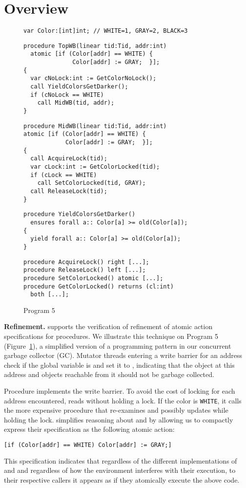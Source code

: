 \section{Overview}
\label{sec:overview}

\begin{figure}
\begin{verbatim}
var Color:[int]int; // WHITE=1, GRAY=2, BLACK=3
\end{verbatim}
\begin{verbatim}
procedure TopWB(linear tid:Tid, addr:int)
  atomic [if (Color[addr] == WHITE) { 
              Color[addr] := GRAY;  }];
{
  var cNoLock:int := GetColorNoLock();
  call YieldColorsGetDarker(); 
  if (cNoLock == WHITE) 
    call MidWB(tid, addr);
}
\end{verbatim}
\begin{verbatim}
procedure MidWB(linear tid:Tid, addr:int)
atomic [if (Color[addr] == WHITE) {
            Color[addr] := GRAY;  }];
{
  call AcquireLock(tid);
  var cLock:int := GetColorLocked(tid);
  if (cLock == WHITE) 
    call SetColorLocked(tid, GRAY);
  call ReleaseLock(tid);
}
\end{verbatim}
\begin{verbatim}
procedure YieldColorsGetDarker()
  ensures forall a:: Color[a] >= old(Color[a]);
{
  yield forall a:: Color[a] >= old(Color[a]);
}
\end{verbatim}
\begin{verbatim}
procedure AcquireLock() right [...];
procedure ReleaseLock() left [...];
procedure SetColorLocked() atomic [...];
procedure GetColorLocked() returns (cl:int)
  both [...];
\end{verbatim}
\caption{Program 5}
\label{fig:reft}
\end{figure}

{\bf Refinement.} 
\civl supports the verification of refinement of atomic action specifications for procedures. 
We illustrate this technique on Program 5 (Figure~\ref{fig:reft}),
a simplified version of a programming pattern in our concurrent garbage collector (GC).
Mutator threads entering a write barrier for an address  check
if the global variable  is 
and set it to , indicating that the object at this address
and objects reachable from it should not be garbage collected. 

Procedure  implements the write barrier.
To avoid the cost of locking for each address encountered,  reads  without holding a lock.
If the color is {\tt WHITE}, it calls the more expensive procedure  
that re-examines and possibly updates  while holding the lock.
\civl simplifies reasoning about  and  by allowing us to 
compactly express their specification as the following atomic action:
\begin{verbatim}
[if (Color[addr] == WHITE) Color[addr] := GRAY;]
\end{verbatim}
This specification indicates that regardless of the different implementations of 
 and  and regardless of how the environment interferes
with their execution, to their respective callers it appears as if they atomically execute the above code.

